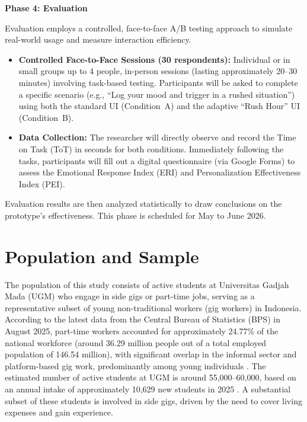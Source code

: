 \textbf{Phase 4: Evaluation}

Evaluation employs a controlled, face-to-face A/B testing approach to simulate real-world usage and measure interaction efficiency.

\begin{itemize}
    \item \textbf{Controlled Face-to-Face Sessions (30 respondents):} Individual or in small groups up to 4 people, in-person sessions (lasting approximately 20--30 minutes) involving task-based testing. Participants will be asked to complete a specific scenario (e.g., ``Log your mood and trigger in a rushed situation'') using both the standard UI (Condition~A) and the adaptive ``Rush Hour'' UI (Condition~B).
    \item \textbf{Data Collection:} The researcher will directly observe and record the Time on Task (ToT) in seconds for both conditions. Immediately following the tasks, participants will fill out a digital questionnaire (via Google Forms) to assess the Emotional Response Index (ERI) and Personalization Effectiveness Index (PEI).
\end{itemize}

Evaluation results are then analyzed statistically to draw conclusions on the prototype's effectiveness. This phase is scheduled for May to June 2026.

\section{Population and Sample}

The population of this study consists of active students at Universitas Gadjah Mada (UGM) who engage in side gigs or part-time jobs, serving as a representative subset of young non-traditional workers (gig workers) in Indonesia. According to the latest data from the Central Bureau of Statistics (BPS) in August 2025, part-time workers accounted for approximately 24.77\% of the national workforce (around 36.29 million people out of a total employed population of 146.54 million), with significant overlap in the informal sector and platform-based gig work, predominantly among young individuals \cite{bps2025pressrelease}. The estimated number of active students at UGM is around 55,000--60,000, based on an annual intake of approximately 10,629 new students in 2025 \cite{ugm2025admission}. A substantial subset of these students is involved in side gigs, driven by the need to cover living expenses and gain experience.

